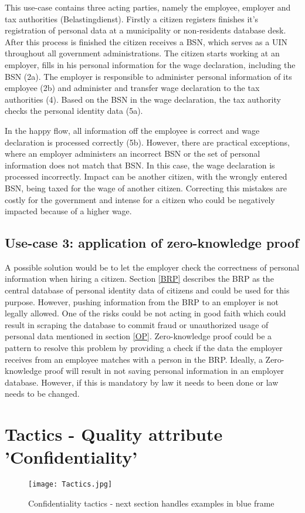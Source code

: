 This use-case contains three acting parties, namely the employee, employer and tax authorities (Belastingdienst).
Firstly a citizen registers finishes it's registration of personal data at a municipality or non-residents database desk. After this process is finished the citizen receives a BSN, which serves as a UIN throughout all government administrations. The citizen starts working at an employer, fills in his personal information for the wage declaration, including the BSN (2a). The employer is responsible to administer personal information of its employee (2b) and administer and transfer wage declaration to the tax authorities (4). Based on the BSN in the wage declaration, the tax authority checks the personal identity data (5a). \par
In the happy flow, all information off the employee is correct and wage declaration is processed correctly (5b). However, there are practical exceptions, where an employer administers an incorrect BSN or the set of personal information does not match that BSN. In this case, the wage declaration is processed incorrectly. Impact can be another citizen, with the wrongly entered BSN, being taxed for the wage of another citizen. Correcting this mistakes are costly for the government and intense for a citizen who could be negatively impacted because of a higher wage.

\subsection{Use-case 3: application of zero-knowledge proof}
A possible solution would be to let the employer check the correctness of personal information when hiring a citizen. Section \ref{BRP} describes the BRP as the central database of personal identity data of citizens and could be used for this purpose. However, pushing information from the BRP to an employer is not legally allowed. One of the risks could be not acting in good faith which could result in scraping the database to commit fraud or unauthorized usage of personal data mentioned in section \ref{OP}. Zero-knowledge proof could be a pattern to resolve this problem by providing a check if the data the employer receives from an employee matches with a person in the BRP. Ideally, a Zero-knowledge proof will result in not saving personal information in an employer database. However, if this is mandatory by law it needs to been done or law needs to be changed.
\clearpage

\section{Tactics - Quality attribute 'Confidentiality'}
\graphicspath{ {./images/} }
\begin{figure}
\centering
\label{fig:Tactics}
\texttt{[image: Tactics.jpg]}\\
\caption{Confidentiality tactics - next section handles examples in blue frame}
\end{figure}

